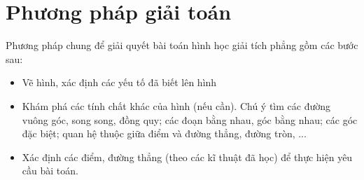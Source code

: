 \section{Phương pháp giải toán}
Phương pháp chung để giải quyết bài toán hình học giải tích phẳng gồm các bước sau:
\begin{itemize}
\item Vẽ hình, xác định các yếu tố đã biết lên hình
\item Khám phá các tính chất khác của hình (nếu cần). Chú ý tìm các đường vuông góc, song song, đồng quy; các đoạn bằng nhau, góc bằng nhau; các góc đặc biệt; quan hệ thuộc giữa điểm và đường thẳng, đường tròn, ...
\item Xác định các điểm, đường thẳng (theo các kĩ thuật đã học) để thực hiện yêu cầu bài toán.
\end{itemize}
